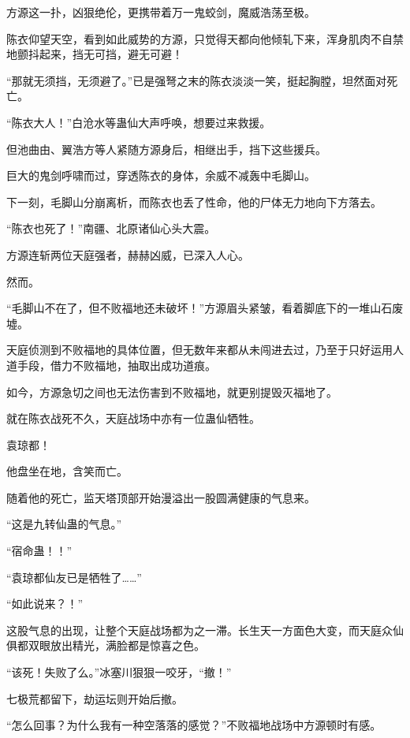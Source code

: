 
\begin{this_body}



方源这一扑，凶狠绝伦，更携带着万一鬼蛟剑，魔威浩荡至极。

陈衣仰望天空，看到如此威势的方源，只觉得天都向他倾轧下来，浑身肌肉不自禁地颤抖起来，挡无可挡，避无可避！

“那就无须挡，无须避了。”已是强弩之末的陈衣淡淡一笑，挺起胸膛，坦然面对死亡。

“陈衣大人！”白沧水等蛊仙大声呼唤，想要过来救援。

但池曲由、翼浩方等人紧随方源身后，相继出手，挡下这些援兵。

巨大的鬼剑呼啸而过，穿透陈衣的身体，余威不减轰中毛脚山。

下一刻，毛脚山分崩离析，而陈衣也丢了性命，他的尸体无力地向下方落去。

“陈衣也死了！”南疆、北原诸仙心头大震。

方源连斩两位天庭强者，赫赫凶威，已深入人心。

然而。

“毛脚山不在了，但不败福地还未破坏！”方源眉头紧皱，看着脚底下的一堆山石废墟。

天庭侦测到不败福地的具体位置，但无数年来都从未闯进去过，乃至于只好运用人道手段，借力不败福地，抽取出成功道痕。

如今，方源急切之间也无法伤害到不败福地，就更别提毁灭福地了。

就在陈衣战死不久，天庭战场中亦有一位蛊仙牺牲。

袁琼都！

他盘坐在地，含笑而亡。

随着他的死亡，监天塔顶部开始漫溢出一股圆满健康的气息来。

“这是九转仙蛊的气息。”

“宿命蛊！！”

“袁琼都仙友已是牺牲了……”

“如此说来？！”

这股气息的出现，让整个天庭战场都为之一滞。长生天一方面色大变，而天庭众仙俱都双眼放出精光，满脸都是惊喜之色。

“该死！失败了么。”冰塞川狠狠一咬牙，“撤！”

七极荒都留下，劫运坛则开始后撤。

“怎么回事？为什么我有一种空落落的感觉？”不败福地战场中方源顿时有感。


\end{this_body}
